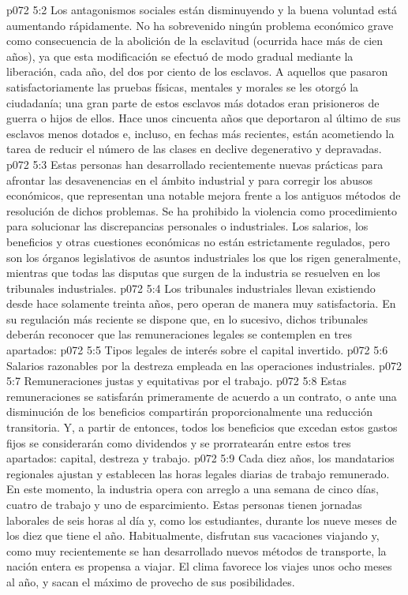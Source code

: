 \vs p072 5:2 Los antagonismos sociales están disminuyendo y la buena voluntad está aumentando rápidamente. No ha sobrevenido ningún problema económico grave como consecuencia de la abolición de la esclavitud (ocurrida hace más de cien años), ya que esta modificación se efectuó de modo gradual mediante la liberación, cada año, del dos por ciento de los esclavos. A aquellos que pasaron satisfactoriamente las pruebas físicas, mentales y morales se les otorgó la ciudadanía; una gran parte de estos esclavos más dotados eran prisioneros de guerra o hijos de ellos. Hace unos cincuenta años que deportaron al último de sus esclavos menos dotados e, incluso, en fechas más recientes, están acometiendo la tarea de reducir el número de las clases en declive degenerativo y depravadas.
\vs p072 5:3 \pc Estas personas han desarrollado recientemente nuevas prácticas para afrontar las desavenencias en el ámbito industrial y para corregir los abusos económicos, que representan una notable mejora frente a los antiguos métodos de resolución de dichos problemas. Se ha prohibido la violencia como procedimiento para solucionar las discrepancias personales o industriales. Los salarios, los beneficios y otras cuestiones económicas no están estrictamente regulados, pero son los órganos legislativos de asuntos industriales los que los rigen generalmente, mientras que todas las disputas que surgen de la industria se resuelven en los tribunales industriales.
\vs p072 5:4 Los tribunales industriales llevan existiendo desde hace solamente treinta años, pero operan de manera muy satisfactoria. En su regulación más reciente se dispone que, en lo sucesivo, dichos tribunales deberán reconocer que las remuneraciones legales se contemplen en tres apartados:
\vs p072 5:5 Tipos legales de interés sobre el capital invertido.
\vs p072 5:6 Salarios razonables por la destreza empleada en las operaciones industriales.
\vs p072 5:7 Remuneraciones justas y equitativas por el trabajo.
\vs p072 5:8 \pc Estas remuneraciones se satisfarán primeramente de acuerdo a un contrato, o ante una disminución de los beneficios compartirán proporcionalmente una reducción transitoria. Y, a partir de entonces, todos los beneficios que excedan estos gastos fijos se considerarán como dividendos y se prorratearán entre estos tres apartados: capital, destreza y trabajo.
\vs p072 5:9 \pc Cada diez años, los mandatarios regionales ajustan y establecen las horas legales diarias de trabajo remunerado. En este momento, la industria opera con arreglo a una semana de cinco días, cuatro de trabajo y uno de esparcimiento. Estas personas tienen jornadas laborales de seis horas al día y, como los estudiantes, durante los nueve meses de los diez que tiene el año. Habitualmente, disfrutan sus vacaciones viajando y, como muy recientemente se han desarrollado nuevos métodos de transporte, la nación entera es propensa a viajar. El clima favorece los viajes unos ocho meses al año, y sacan el máximo de provecho de sus posibilidades.
